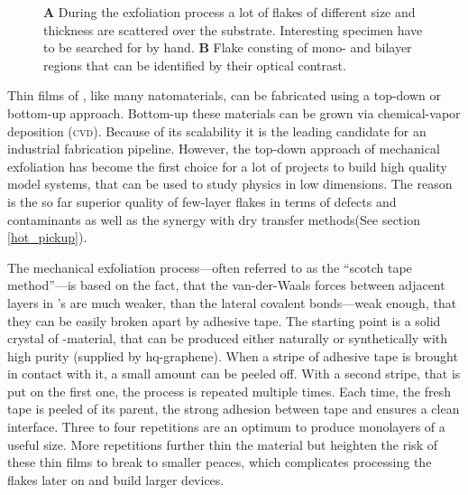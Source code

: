 \begin{figure}
\begin{subfigure}{0.349\textwidth}
\end{subfigure}
\caption{\textbf{A} During the exfoliation process a lot of flakes of different size and thickness are scattered over the substrate. Interesting specimen have to be searched for by hand. \textbf{B} Flake consting of mono- and bilayer regions that can be identified by their optical contrast.}
	\label{flakes}
\end{figure}

Thin films of \tmds\!, like many natomaterials, can be fabricated using a top-down or bottom-up approach. Bottom-up these materials can be grown via chemical-vapor deposition (\textsc{cvd})\cite{chen_chemical_2016}. Because of its scalability it is the leading candidate for an industrial fabrication pipeline. However, the top-down approach of mechanical exfoliation has become the first choice for a lot of projects to build high quality model systems, that can be used to study physics in low dimensions\cite{geim_rise_2007}. The reason is the so far superior quality of few-layer flakes in terms of defects and contaminants as well as the synergy with dry transfer methods(See section \ref{hot_pickup}). 

The mechanical exfoliation process---often referred to as the ``scotch tape method''---is based on the fact, that the van-der-Waals forces between adjacent layers in \tmd's are much weaker, than the lateral covalent bonds---weak enough, that they can be easily broken apart by adhesive tape. The starting point is a solid crystal of \tmd-material, that can be produced either naturally or synthetically with high purity (supplied by hq-graphene). When a stripe of adhesive tape is brought in contact with it, a small amount can be peeled off. With a second stripe, that is put on the first one, the process is repeated multiple times. Each time, the fresh tape is peeled of its parent, the strong adhesion between tape and \tmdg ensures a clean interface. Three to four repetitions are an optimum to produce monolayers of a useful size. More repetitions further thin the material but heighten the risk of these thin films to break to smaller peaces, which complicates processing the flakes later on and build larger devices. 

